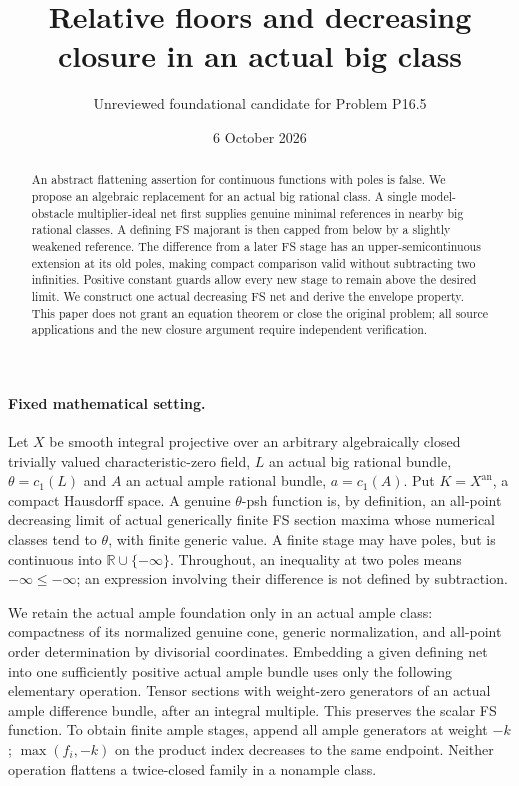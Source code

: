 \documentclass[10pt]{article}
\title{Relative floors and decreasing closure in an actual big class}
\author{Unreviewed foundational candidate for Problem P16.5}
\date{6 October 2026}
\newcommand{\an}{\mathrm{an}}
\begin{document}
\maketitle
\begin{abstract}
An abstract flattening assertion for continuous functions with poles is
false. We propose an algebraic replacement for an actual big rational
class. A single model-obstacle multiplier-ideal net first supplies
genuine minimal references in nearby big rational classes. A defining
FS majorant is then capped from below by a slightly weakened reference.
The difference from a later FS stage has an upper-semicontinuous
extension at its old poles, making compact comparison valid without
subtracting two infinities. Positive constant guards allow every new
stage to remain above the desired limit. We construct one actual
decreasing FS net and derive the envelope property. This paper does
not grant an equation theorem or close the original problem; all
source applications and the new closure argument require independent
verification.
\end{abstract}

\paragraph{Fixed mathematical setting.}
Let $X$ be smooth integral projective over an arbitrary algebraically
closed trivially valued characteristic-zero field, $L$ an actual big
rational bundle, $\theta=c_1(L)$ and $A$ an actual ample rational
bundle, $a=c_1(A)$. Put $K=X^\an$, a compact Hausdorff space.
A genuine $\theta$-psh function is, by definition, an all-point
decreasing limit of actual generically finite FS section maxima whose
numerical classes tend to $\theta$, with finite generic value. A finite
stage may have poles, but is continuous into $\mathbb R\cup\{-\infty\}$.
Throughout, an inequality at two poles means $-\infty\le-\infty$;
an expression involving their difference is not defined by subtraction.

We retain the actual ample foundation only in an actual ample class:
compactness of its normalized genuine cone, generic normalization,
and all-point order determination by divisorial coordinates. Embedding
a given defining net into one sufficiently positive actual ample bundle
uses only the following elementary operation. Tensor sections with
weight-zero generators of an actual ample difference bundle, after an
integral multiple. This preserves the scalar FS function. To obtain
finite ample stages, append all ample generators at weight $-k$;
$\max(f_i,-k)$ on the product index decreases to the same endpoint.
Neither operation flattens a twice-closed family in a nonample class.
\end{document}
